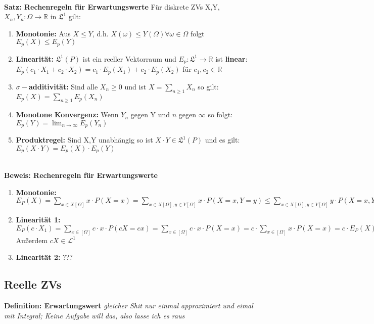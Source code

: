 \documentclass[a4paper,11pt]{scrartcl}
\begin{document}
\textbf{\\Satz: Rechenregeln für Erwartungswerte}
Für diskrete ZVs X,Y,$X_n,Y_n: \Omega \rightarrow \mathbb{R}$ in $\mathfrak{L}^1$ gilt:
\begin{enumerate}
    \item \textbf{Monotonie:} Aus $X \leq Y$, d.h. $X(\omega) \leq Y(\Omega) \forall \omega \in \Omega$ folgt $E_p(X) \leq E_p(Y)$
    \item \textbf{Linearität:} $\mathfrak{L}^1 (P)$ ist ein reeller Vektorraum und $E_p: \mathfrak{L}^1 \rightarrow \mathbb{R}$ ist \textbf{linear}: $E_p(c_1 \cdot X_1 + c_2 \cdot X_2) = c_1 \cdot E_p(X_1) + c_2 \cdot E_p(X_2)$ für $c_1,c_2 \in \mathbb{R}$
    \item \textbf{$\sigma-$additivität:} Sind alle $X_n \geq 0$ und ist $X = \sum_{n \geq 1} X_n$ so gilt: $E_p(X) = \sum_{n \geq 1} E_p(X_n)$
    \item \textbf{Monotone Konvergenz:} Wenn $Y_n$ gegen Y und $n$ gegen $\infty$ so folgt: $E_p(Y) = \lim_{n \rightarrow \infty} E_p(Y_n)$
    \item \textbf{Produktregel:} Sind X,Y unabhängig so ist $X \cdot Y \in \mathfrak{L}^1(P)$ und es gilt: $E_p(X \cdot Y) = E_p(X) \cdot E_p(Y)$
\end{enumerate}

\textbf{\\Beweis: Rechenregeln für Erwartungswerte}
\begin{enumerate}
    \item \textbf{Monotonie:} $E_P(X) = \sum_{x \in X[\Omega]} x \cdot P(X=x) = \sum_{x \in X[\Omega], y \in Y[\Omega]} x \cdot P(X=x, Y=y) \leq \sum_{x \in X[\Omega], y \in Y[\Omega]} y \cdot P(X=x, Y=y) = \sum_{y \in X[\Omega]} y \cdot P(Y=y) = E_P(Y)$ 
    \item \textbf{Linearität 1:} $E_P(c \cdot X_1) = \sum_{x \in [\Omega]} c \cdot x \cdot P(cX=cx) = \sum_{x \in [\Omega]} c \cdot x \cdot P(X=x) = c \cdot \sum_{x \in [\Omega]}  x \cdot P(X=x) = c \cdot E_P(X)$ Außerdem $cX \in \mathcal{L}^1$
    \item \textbf{Linearität 2:} ???
\end{enumerate}

\subsection{Reelle ZVs}
\textbf{Definition: Erwartungswert}
\textit{gleicher Shit nur einmal approximiert und eimal mit Integral; Keine Aufgabe will das, also lasse ich es raus}
\end{document}
